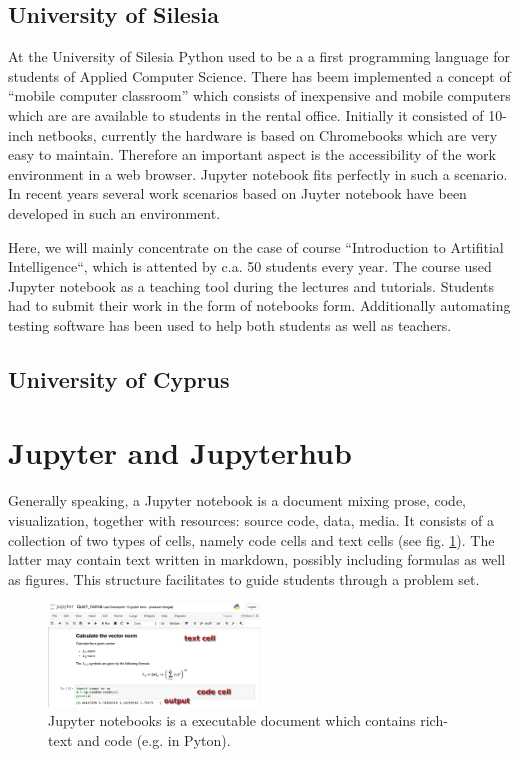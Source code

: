 \documentclass[twocolumn]{svjour3}          %
\begin{document}
\subsection{University of Silesia}

At the University of Silesia Python used to be a a first programming
language for students of Applied Computer Science. There has beem
implemented a concept of ``mobile computer classroom'' which consists
of inexpensive and mobile computers which are are available to
students in the rental office. Initially it consisted of 10-inch
netbooks, currently the hardware is based on Chromebooks which are
very easy to maintain. Therefore an important aspect is the
accessibility of the work environment in a web browser. Jupyter
notebook fits perfectly in such a scenario. In recent years several
work scenarios based on Juyter notebook have been developed in such an
environment.

Here, we will mainly concentrate on the case of course ``Introduction
to Artifitial Intelligence``, which is attented by c.a. 50 students
every year. The course used Jupyter notebook as a teaching tool during
the lectures and tutorials. Students had to submit their work in the
form of notebooks form. Additionally automating testing software has been 
used to help both students as well as teachers.


\subsection{University of Cyprus}





\section{Jupyter and Jupyterhub}
\label{sec:jupyter_jupyterhub}

Generally speaking, a Jupyter notebook is a document mixing prose,
code, visualization, together with resources: source code, data,
media.  It consists of a collection of two types of cells, namely code
cells and text cells (see fig. \ref{fig:notebook}). The latter may
contain text written in markdown, possibly including formulas as well
as figures. This structure facilitates to guide students through a
problem set.

\begin{figure}
  \includegraphics[width=0.5\textwidth]{figs/notebook.png}
\caption{Jupyter notebooks is a executable document which contains
  rich-text and code (e.g. in Pyton). }
\label{fig:notebook}
\end{figure}
\end{document}
